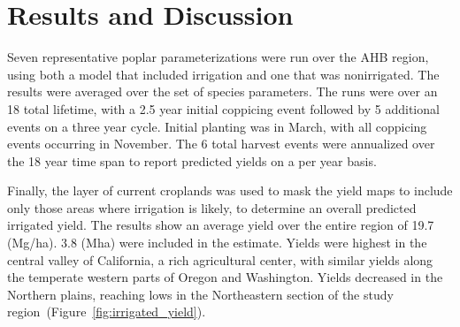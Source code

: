 \documentclass[preprint,12pt]{elsarticle}
\begin{document}
\section{Results and Discussion}

Seven representative poplar parameterizations were run over the
\ac{AHB} region, using both a model that included irrigation and one
that was nonirrigated.  The results were averaged over the set of
species parameters.  The runs were over an 18 total lifetime, with a
2.5 year initial coppicing event followed by 5 additional events on a
three year cycle.  Initial planting was in March, with all coppicing
events occurring in November.  The 6 total harvest events were
annualized over the 18 year time span to report predicted yields on a
per year basis.

Finally, the layer of current croplands was used to mask the yield
maps to include only those areas where irrigation is likely, to
determine an overall predicted irrigated yield.  The results show an
average yield over the entire region of 19.7 (Mg/ha).  3.8 (Mha) were
included in the estimate.  Yields were highest in the central valley
of California, a rich agricultural center, with similar yields along
the temperate western parts of Oregon and Washington.  Yields
decreased in the Northern plains, reaching lows in the Northeastern
section of the study region~(Figure~\ref{fig:irrigated_yield}).
\end{document}
